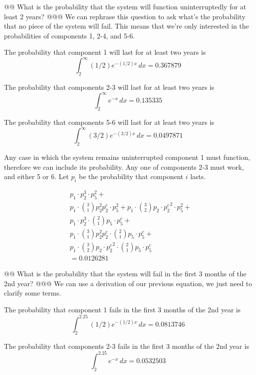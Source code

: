 \documentclass[10pt]{article}
\begin{document}
\begin{easylist}[enumerate]
    @@ What is the probability that the system will function uninterruptedly for at least 2 years?
    @@@ We can rephrase this question to ask what's the probability that no piece of the system will fail. This means
    that we're only interested in the probabilities of components 1, 2-4, and 5-6.\newline

    The probability that component 1 will last for at least two years is
    \[
        \int^\infty_2 (1/2)e^{-(1/2)x} \, dx = 0.367879
    \]

    The probability that components 2-3 will last for at least two years is
    \[
        \int^\infty_2 e^{-x} \, dx = 0.135335
    \]

    The probability that components 5-6 will last for at least two years is
    \[
        \int^\infty_2 (3/2)e^{-(3/2)x} \, dx = 0.0497871
    \]

    Any case in which the system remains uninterrupted component 1 must function, therefore we can include its
    probability. Any one of components 2-3 must work, and either 5 or 6. Let $p_i$ be the probability that component $i$
    lasts.

    \[
        \begin{aligned}
            & p_1 \cdot p_2^3 \cdot p_5^2 +\\
            & p_1 \cdot \binom{3}{1} p_2^2 p_2^c \cdot p_5^2 + p_1 \cdot \binom{3}{2} p_2 \cdot {p_2^c}^2 \cdot p_5^2 +\\
            & p_1 \cdot p_2^3 \cdot \binom{2}{1} p_5 \cdot p_5^c +\\
            & p_1 \cdot \binom{3}{1} p_2^2 p_2^c \cdot \binom{2}{1} p_5 \cdot p_5^c +\\
            & p_1 \cdot \binom{3}{2} p_2 \cdot {p_2^c}^2 \cdot \binom{2}{1} p_5 \cdot p_5^c\\
            & = \boxed{0.0126281}
        \end{aligned}
    \]

    @@ What is the probability that the system will fail in the first 3 months of the 2nd year?
    @@@ We can use a derivation of our previous equation, we just need to clarify some terms.\newline

    The probability that component 1 fails in the first 3 months of the 2nd year is
    \[
        \int^{2.25}_2 (1/2)e^{-(1/2)x} \, dx = 0.0813746
    \]

    The probability that components 2-3 fails in the first 3 months of the 2nd year is
    \[
        \int^{2.25}_2 e^{-x} \, dx = 0.0532503
    \]


\end{easylist}
\end{document}
